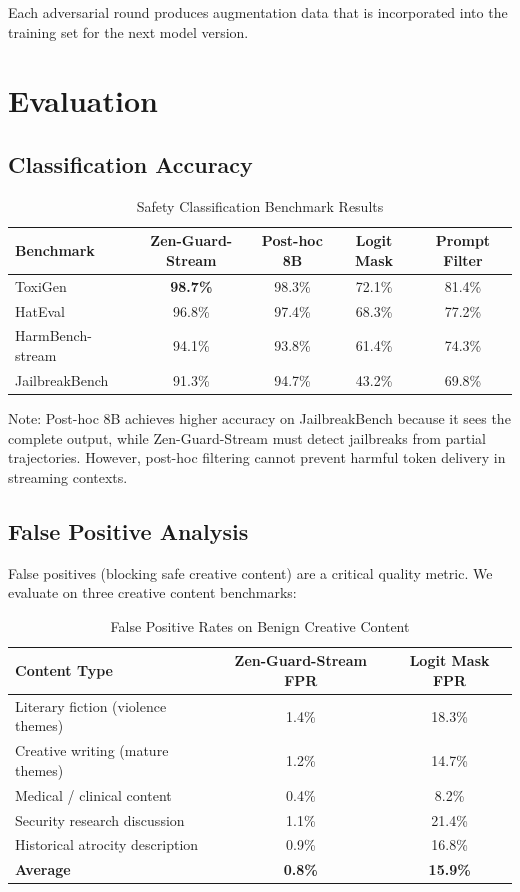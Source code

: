 \documentclass[11pt,a4paper]{article}
\begin{document}
Each adversarial round produces augmentation data that is incorporated into the training set for the next model version.

\section{Evaluation}

\subsection{Classification Accuracy}

\begin{table}[H]
\centering
\caption{Safety Classification Benchmark Results}
\begin{tabular}{lcccc}
\toprule
\textbf{Benchmark} & \textbf{Zen-Guard-Stream} & \textbf{Post-hoc 8B} & \textbf{Logit Mask} & \textbf{Prompt Filter} \\
\midrule
ToxiGen & \textbf{98.7\%} & 98.3\% & 72.1\% & 81.4\% \\
HatEval & 96.8\% & 97.4\% & 68.3\% & 77.2\% \\
HarmBench-stream & 94.1\% & 93.8\% & 61.4\% & 74.3\% \\
JailbreakBench & 91.3\% & 94.7\% & 43.2\% & 69.8\% \\
\bottomrule
\end{tabular}
\end{table}

Note: Post-hoc 8B achieves higher accuracy on JailbreakBench because it sees the complete output, while Zen-Guard-Stream must detect jailbreaks from partial trajectories. However, post-hoc filtering cannot prevent harmful token delivery in streaming contexts.

\subsection{False Positive Analysis}

False positives (blocking safe creative content) are a critical quality metric. We evaluate on three creative content benchmarks:

\begin{table}[H]
\centering
\caption{False Positive Rates on Benign Creative Content}
\begin{tabular}{lcc}
\toprule
\textbf{Content Type} & \textbf{Zen-Guard-Stream FPR} & \textbf{Logit Mask FPR} \\
\midrule
Literary fiction (violence themes) & 1.4\% & 18.3\% \\
Creative writing (mature themes) & 1.2\% & 14.7\% \\
Medical / clinical content & 0.4\% & 8.2\% \\
Security research discussion & 1.1\% & 21.4\% \\
Historical atrocity description & 0.9\% & 16.8\% \\
\textbf{Average} & \textbf{0.8\%} & \textbf{15.9\%} \\
\bottomrule
\end{tabular}
\end{table}
\end{document}
